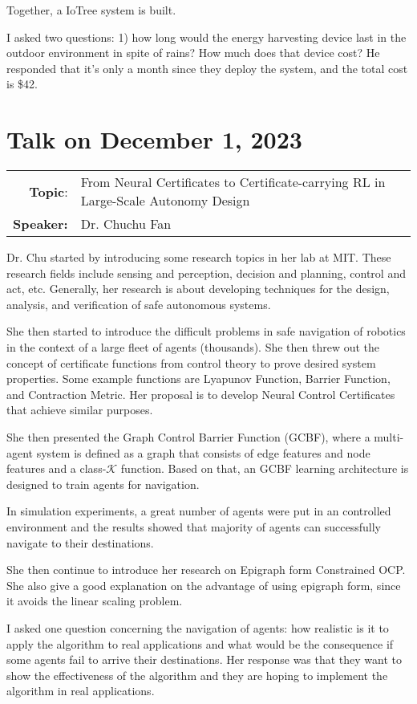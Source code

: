 \documentclass[11pt, oneside]{article}   	%
\begin{document}
Together, a IoTree system is built. 

I asked two questions: 1) how long would the energy harvesting device last in the outdoor environment in spite of rains? How much does that device cost? He responded that it's only a month since they deploy the system, and the total cost is \$42.



\newpage
\section{Talk on December 1, 2023}
\begin{tabularx} {\textwidth}{r X}
\textbf{Topic}: &From Neural Certificates to Certificate-carrying RL in Large-Scale Autonomy Design\\
\textbf{Speaker:} & Dr. Chuchu Fan\\
\end{tabularx}


Dr. Chu started by introducing some research topics in her lab at MIT. These research fields include sensing and perception, decision and planning, control and act, etc. Generally, her research is about developing techniques for the design, analysis, and verification of safe autonomous systems.

She then started to introduce the difficult problems in safe navigation of robotics in the context of a large fleet of agents (thousands). She then threw out the concept of certificate functions from control theory to prove desired system properties. Some example functions are Lyapunov Function, Barrier Function, and Contraction Metric. Her proposal is to develop Neural Control Certificates that achieve similar purposes. 

She then presented the Graph Control Barrier Function (GCBF), where a multi-agent system is defined as a graph that consists of edge features and node features and a class-$\mathcal{K}$ function. Based on that, an GCBF learning architecture is designed to train agents for navigation. 

In simulation experiments, a great number of agents were put in an controlled environment and the results showed that majority of agents can successfully navigate to their destinations. 

She then continue to introduce her research on Epigraph form Constrained OCP. She also give a good explanation on the advantage of using epigraph form, since it avoids the linear scaling problem.

I asked one question concerning the navigation of agents: how realistic is it to apply the algorithm to real applications and what would be the consequence if some agents fail to arrive their destinations. Her response was that they want to show the effectiveness of the algorithm and they are hoping to implement the algorithm in real applications.
\end{document}

